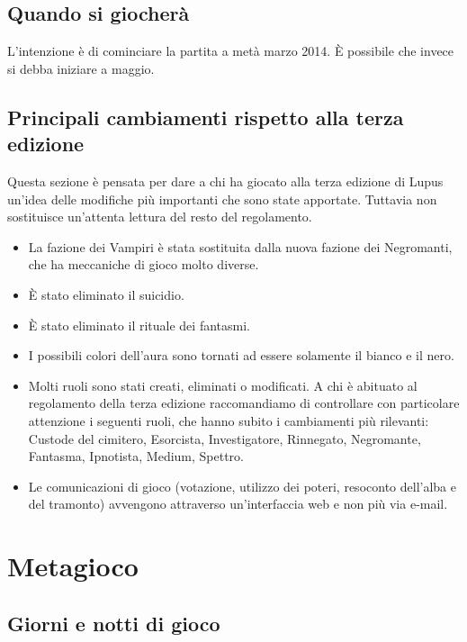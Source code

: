 \documentclass[a4paper,10pt]{article}
\begin{document}
\subsection{Quando si giocherà}

L'intenzione è di cominciare la partita a metà marzo 2014. È possibile che
invece si debba iniziare a maggio.


\subsection{Principali cambiamenti rispetto alla terza edizione}

Questa sezione è pensata per dare a chi ha giocato alla terza edizione di Lupus
un'idea delle modifiche più importanti che sono state apportate. Tuttavia non
sostituisce un'attenta lettura del resto del regolamento.

\begin{itemize}
 \item La fazione dei Vampiri è stata sostituita dalla nuova fazione dei
Negromanti, che ha meccaniche di gioco molto diverse.
 \item È stato eliminato il suicidio.
 \item È stato eliminato il rituale dei fantasmi.
 \item I possibili colori dell'aura sono tornati ad essere solamente il bianco e
il nero.
 \item Molti ruoli sono stati creati, eliminati o modificati. A chi è abituato
al regolamento della terza edizione raccomandiamo di controllare con particolare
attenzione i seguenti ruoli, che hanno subito i cambiamenti più rilevanti:
Custode del cimitero, Esorcista, Investigatore, Rinnegato, Negromante, Fantasma,
Ipnotista, Medium, Spettro.
 \item Le comunicazioni di gioco (votazione, utilizzo dei poteri, resoconto
dell'alba e del tramonto) avvengono attraverso un'interfaccia web e non più via
e-mail.
\end{itemize}



\pagebreak
\section{Metagioco}

\subsection{Giorni e notti di gioco}
\end{document}
